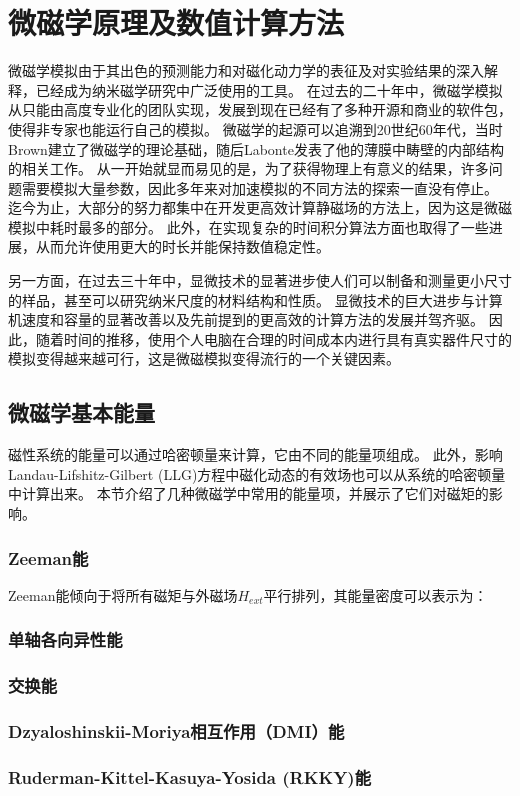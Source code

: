 \chapter{微磁学原理及数值计算方法}
微磁学模拟由于其出色的预测能力和对磁化动力学的表征及对实验结果的深入解释，已经成为纳米磁学研究中广泛使用的工具。
在过去的二十年中，微磁学模拟从只能由高度专业化的团队实现，发展到现在已经有了多种开源和商业的软件包，使得非专家也能运行自己的模拟。
微磁学的起源可以追溯到20世纪60年代，当时Brown建立了微磁学的理论基础，随后Labonte发表了他的薄膜中畴壁的内部结构的相关工作。
从一开始就显而易见的是，为了获得物理上有意义的结果，许多问题需要模拟大量参数，因此多年来对加速模拟的不同方法的探索一直没有停止。
迄今为止，大部分的努力都集中在开发更高效计算静磁场的方法上，因为这是微磁模拟中耗时最多的部分。
此外，在实现复杂的时间积分算法方面也取得了一些进展，从而允许使用更大的时长并能保持数值稳定性。\par
另一方面，在过去三十年中，显微技术的显著进步使人们可以制备和测量更小尺寸的样品，甚至可以研究纳米尺度的材料结构和性质。
显微技术的巨大进步与计算机速度和容量的显著改善以及先前提到的更高效的计算方法的发展并驾齐驱。
因此，随着时间的推移，使用个人电脑在合理的时间成本内进行具有真实器件尺寸的模拟变得越来越可行，这是微磁模拟变得流行的一个关键因素。
\section{微磁学基本能量}
磁性系统的能量可以通过哈密顿量来计算，它由不同的能量项组成。
此外，影响Landau-Lifshitz-Gilbert (LLG)方程中磁化动态的有效场也可以从系统的哈密顿量中计算出来。
本节介绍了几种微磁学中常用的能量项，并展示了它们对磁矩的影响。
\subsection{Zeeman能}
Zeeman能倾向于将所有磁矩与外磁场$H_{ext}$平行排列，其能量密度可以表示为：
\subsection{单轴各向异性能}
\subsection{交换能}
\subsection{Dzyaloshinskii-Moriya相互作用（DMI）能}
\subsection{Ruderman-Kittel-Kasuya-Yosida (RKKY)能}
